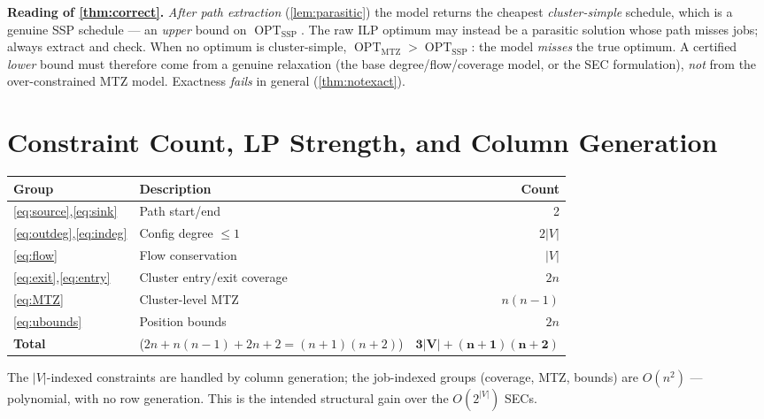 \documentclass[11pt,a4paper]{article}
\theoremstyle{plain}
\theoremstyle{definition}
\DeclareMathOperator{\OPT}{OPT}
\newcommand{\OMTZ}{\OPT_{\mathrm{MTZ}}}
\newcommand{\OSSP}{\OPT_{\mathrm{SSP}}}
\begin{document}
\begin{warnbox}
	\textbf{Reading of \cref{thm:correct}.} \emph{After path extraction}
	(\cref{lem:parasitic}) the model returns the cheapest
	\emph{cluster-simple} schedule, which is a genuine SSP schedule --- an \emph{upper} bound on
	$\OSSP$. The raw ILP optimum may instead be a parasitic solution whose path misses jobs;
	always extract and check. When no optimum is cluster-simple, $\OMTZ>\OSSP$: the model \emph{misses} the true
	optimum. A certified \emph{lower} bound must therefore come from a genuine relaxation (the
	base degree/flow/coverage model, or the SEC formulation), \emph{not} from the
	over-constrained MTZ model. Exactness \emph{fails} in general (\cref{thm:notexact}).
\end{warnbox}

\section{Constraint Count, LP Strength, and Column Generation}
\label{sec:complexity}

\begin{center}
	\renewcommand{\arraystretch}{1.35}
	\begin{tabularx}{\textwidth}{@{}lXr@{}}
		\toprule
		\textbf{Group} & \textbf{Description} & \textbf{Count} \\
		\midrule
		\eqref{eq:source},\eqref{eq:sink} & Path start/end & 2 \\
		\eqref{eq:outdeg},\eqref{eq:indeg} & Config degree $\le1$ & $2|V|$ \\
		\eqref{eq:flow} & Flow conservation & $|V|$ \\
		\eqref{eq:exit},\eqref{eq:entry} & Cluster entry/exit coverage & $2n$ \\
		\eqref{eq:MTZ} & Cluster-level MTZ & $n(n-1)$ \\
		\eqref{eq:ubounds} & Position bounds & $2n$ \\
		\midrule
		\textbf{Total} & ($2n+n(n-1)+2n+2=(n+1)(n+2)$) & $\boldsymbol{3|V|+(n+1)(n+2)}$ \\
		\bottomrule
	\end{tabularx}
\end{center}
The $|V|$-indexed constraints are handled by column generation; the job-indexed groups
(coverage, MTZ, bounds) are $O(n^{2})$ --- polynomial, with no row generation. This is the
intended structural gain over the $O(2^{|V|})$ SECs.
\end{document}
